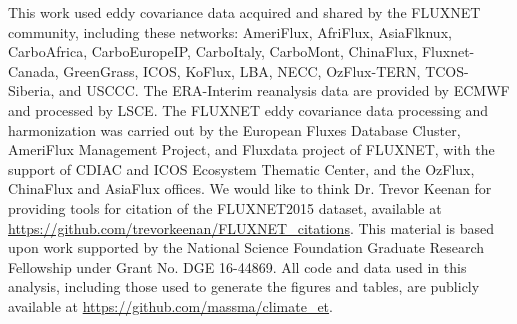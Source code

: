 \acknowledgments This work used eddy covariance data acquired and shared
by the FLUXNET community, including these networks: AmeriFlux, AfriFlux,
AsiaFlknux, CarboAfrica, CarboEuropeIP, CarboItaly, CarboMont,
ChinaFlux, Fluxnet-Canada, GreenGrass, ICOS, KoFlux, LBA, NECC,
OzFlux-TERN, TCOS-Siberia, and USCCC. The ERA-Interim reanalysis data
are provided by ECMWF and processed by LSCE. The FLUXNET eddy covariance
data processing and harmonization was carried out by the European Fluxes
Database Cluster, AmeriFlux Management Project, and Fluxdata project of
FLUXNET, with the support of CDIAC and ICOS Ecosystem Thematic Center,
and the OzFlux, ChinaFlux and AsiaFlux offices. We would like to think
Dr. Trevor Keenan for providing tools for citation of the FLUXNET2015
dataset, available at
\url{https://github.com/trevorkeenan/FLUXNET_citations}. This material is
based upon work supported by the National Science Foundation Graduate
Research Fellowship under Grant No. DGE 16-44869. All code and data used
in this analysis, including those used to generate the figures and
tables, are publicly available at
\url{https://github.com/massma/climate\_et}.





